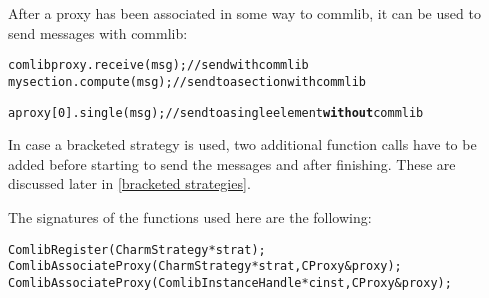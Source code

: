 After a proxy has been associated in some way to commlib, it can be used to send
messages with commlib:

\begin{alltt}
  comlibproxy.receive(msg); // send with commlib
  mysection.compute(msg);   // send to a section with commlib

  aproxy[0].single(msg);    // send to a single element {\textbf{without}} commlib
\end{alltt}

In case a bracketed strategy is used, two additional function calls have to
be added before starting to send the messages and after finishing. These are
discussed later in \ref{bracketed strategies}.

The signatures of the functions used here are the following:

\begin{alltt}
ComlibRegister (CharmStrategy *strat);
ComlibAssociateProxy (CharmStrategy *strat, CProxy &proxy);
ComlibAssociateProxy (ComlibInstanceHandle *cinst, CProxy &proxy);
\end{alltt}








